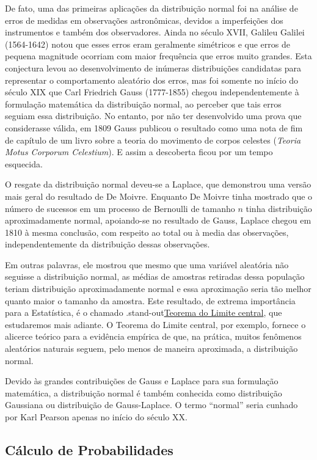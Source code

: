 \documentclass[
]{book}
\theoremstyle{definition}
\theoremstyle{definition}
\theoremstyle{definition}
\theoremstyle{remark}
\begin{document}
De fato, uma das primeiras aplicações da distribuição normal foi na análise de erros de medidas em observações astronômicas, devidos a imperfeições dos instrumentos e também dos observadores. Ainda no século XVII, Galileu Galilei (1564-1642) notou que esses erros eram geralmente simétricos e que erros de pequena magnitude ocorriam com maior frequência que erros muito grandes. Esta conjectura levou ao desenvolvimento de inúmeras distribuições candidatas para representar o comportamento aleatório dos erros, mas foi somente no início do século XIX que Carl Friedrich Gauss (1777-1855) chegou independentemente à formulação matemática da distribuição normal, ao perceber que tais erros seguiam essa distribuição. No entanto, por não ter desenvolvido uma prova que considerasse válida, em 1809 Gauss publicou o resultado como uma nota de fim de capítulo de um livro sobre a teoria do movimento de corpos celestes (\emph{Teoria Motus Corporum Celestium}). E assim a descoberta ficou por um tempo esquecida.

O resgate da distribuição normal deveu-se a Laplace, que demonstrou uma versão mais geral do resultado de De Moivre. Enquanto De Moivre tinha mostrado que o número de sucessos em um processo de Bernoulli de tamanho \(n\) tinha distribuição aproximadamente normal, apoiando-se no resultado de Gauss, Laplace chegou em 1810 à mesma conclusão, com respeito ao total ou à media das observações, independentemente da distribuição dessas observações.

Em outras palavras, ele mostrou que mesmo que uma variável aleatória não seguisse a distribuição normal, as médias de amostras retiradas dessa população teriam distribuição aproximadamente normal e essa aproximação seria tão melhor quanto maior o tamanho da amostra. Este resultado, de extrema importância para a Estatística, é o chamado .stand-out\protect\hyperlink{teorema-do-limite-central}{Teorema do Limite central}, que estudaremos mais adiante. O Teorema do Limite central, por exemplo, fornece o alicerce teórico para a evidência empírica de que, na prática, muitos fenômenos aleatórios naturais seguem, pelo menos de maneira aproximada, a distribuição normal.

Devido às grandes contribuições de Gauss e Laplace para sua formulação matemática, a distribuição normal é também conhecida como distribuição Gaussiana ou distribuição de Gauss-Laplace. O termo ``normal'' seria cunhado por Karl Pearson apenas no início do século XX.

\hypertarget{cuxe1lculo-de-probabilidades}{%
\subsection*{Cálculo de Probabilidades}\label{cuxe1lculo-de-probabilidades}}
\end{document}

